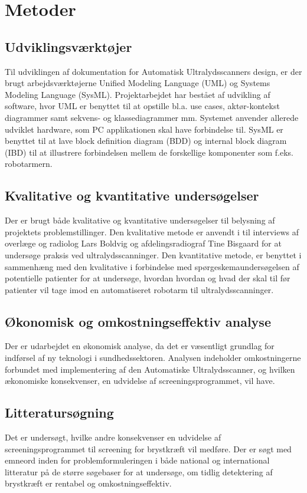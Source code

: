 \chapter{Metoder}\label{Metoder}

\section{Udviklingsværktøjer} 
Til udviklingen af dokumentation for Automatisk Ultralydsscanners design, er der brugt arbejdsværktøjerne Unified Modeling Language (UML)  og Systems Modeling Language (SysML). Projektarbejdet har bestået af udvikling af software, hvor  UML er benyttet til at opstille bl.a. use cases, aktør-kontekst diagrammer samt sekvens- og klassediagrammer mm. Systemet anvender allerede udviklet hardware, som PC applikationen skal have forbindelse til. SysML er benyttet til at lave block definition diagram (BDD) og internal block diagram (IBD) til at illustrere forbindelsen mellem de forskellige komponenter som f.eks. robotarmern.

\section{Kvalitative og kvantitative undersøgelser}
Der er brugt både kvalitative og kvantitative undersøgelser til belysning af projektets problemstillinger. Den kvalitative metode er anvendt i til interviews af overlæge og radiolog Lars Boldvig og afdelingsradiograf Tine Bisgaard for at undersøge praksis ved ultralydsscanninger. Den kvantitative metode,  er benyttet i sammenhæng med den kvalitative i forbindelse med spørgeskemaundersøgelsen af potentielle patienter for at undersøge, hvordan hvordan og hvad der skal til før patienter vil tage imod en automatiseret robotarm til ultralydsscanninger.  

\section{Økonomisk og omkostningseffektiv analyse}
Der er udarbejdet en økonomisk analyse, da det er væsentligt grundlag for indførsel af ny teknologi i sundhedssektoren. Analysen indeholder omkostningerne forbundet med implementering af den Automatiske Ultralydsscanner, og hvilken ækonomiske konsekvenser, en udvidelse af screeningsprogrammet, vil have. 

\section{Litteratursøgning} 
Det er undersøgt, hvilke andre konsekvenser en udvidelse af screeningsprogrammet til screening for brystkræft vil medføre. Der er søgt med emneord inden for problemformuleringen i både national og international litteratur på de større søgebaser for at undersøge, om tidlig detektering af brystkræft er rentabel og omkostningseffektiv. 


